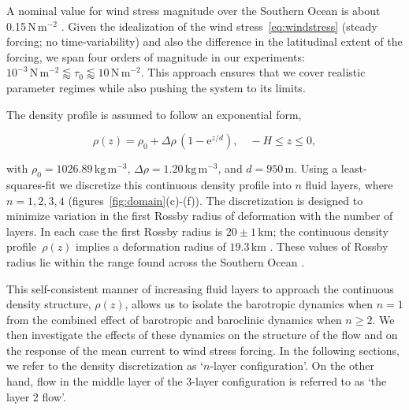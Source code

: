 \documentclass{agujournal2019}
\newcommand{\ee}		{\mathrm{e}}
\renewcommand{\equiv} {\ensuremath{\stackrel{\mathrm{def}}{=}}}
\newcommand{\Pa}		{\mathrm{N}\,\mathrm{m}^{-2}}
\begin{document}
A nominal value for wind stress magnitude over the Southern Ocean is about 0.15$\,\Pa$ \cite{Risien-Chelton-2008}. Given the idealization of the wind stress~\eqref{eq:windstress} (steady forcing; no time-variability) and also the difference in the latitudinal extent of the forcing, we span four orders of magnitude in our experiments: $10^{-3}\,\Pa\lessapprox \tau_0\lessapprox 10\,\Pa$. This approach ensures that we cover realistic parameter regimes while also pushing the system to its limits.



The density profile is assumed to follow an exponential form,
\begin{linenomath*}
\begin{equation}
\rho(z) = \rho_0+ \Delta\rho \, (1-\ee^{z/d}),\quad -H\le z\le 0,
\end{equation} 
\end{linenomath*} 
with $\rho_0=1026.89\,\mathrm{kg}\,\mathrm{m}^{-3}$, $\Delta\rho=1.20\,\mathrm{kg}\,\mathrm{m}^{-3}$, and $d=950\,\mathrm{m}$.  Using a least-squares-fit %
we discretize this continuous density profile into $n$ fluid layers, where $n=1,2,3,4$ (figures~\ref{fig:domain}\mbox{(c)-(f)}). 
The discretization is designed to minimize variation in the first Rossby radius of deformation  with the number of layers.
In each case the first Rossby radius is  $20\pm 1\,\mathrm{km}$; the continuous density profile~$\rho(z)$ implies a deformation radius of $19.3\,\mathrm{km}$ \cite{LaCasce-2012}. These values of Rossby radius lie within the range found across the Southern Ocean \cite{Chelton-etal-1998}. 

This self-consistent manner of increasing fluid layers to approach the continuous density structure, $\rho(z)$, allows us to isolate the barotropic dynamics {\color{black} when $n=1$ from the combined effect of barotropic and baroclinic dynamics when $n\ge 2$}. We then  investigate the effects of these dynamics on the structure of the flow and on the response of the mean current to wind stress forcing. In the following sections, we refer to the  density discretization as `$n$-layer configuration'. On the other hand, flow in the middle layer of the 3-layer configuration is referred to as `the layer 2 flow'.
\end{document}
